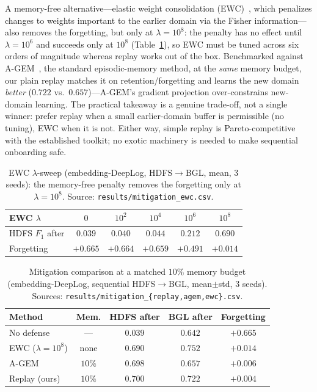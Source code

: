 \documentclass[conference]{IEEEtran}
\begin{document}
A memory-free alternative---elastic weight consolidation (EWC)~\cite{kirkpatrick2017overcoming}, which
penalizes changes to weights important to the earlier domain via the Fisher information---also removes
the forgetting, but only at $\lambda{=}10^{8}$: the penalty has no effect until $\lambda{=}10^{6}$ and
succeeds only at $10^{8}$ (Table~\ref{tab:ewc}), so EWC must be tuned across six orders of magnitude
whereas replay works out of the box. Benchmarked against A-GEM~\cite{agem2019}, the standard
episodic-memory method, at the \emph{same} memory budget, our plain replay matches it on
retention/forgetting and learns the new domain \emph{better} ($0.722$ vs.\ $0.657$)---A-GEM's gradient
projection over-constrains new-domain learning. The practical takeaway is a genuine trade-off, not a
single winner: prefer replay when a small earlier-domain buffer is permissible (no tuning), EWC when it
is not. Either way, simple replay is Pareto-competitive with the established toolkit; no exotic
machinery is needed to make sequential onboarding safe.

\begin{table}[t]
\caption{EWC $\lambda$-sweep (embedding-DeepLog, HDFS$\rightarrow$BGL, mean, $3$ seeds): the memory-free
penalty removes the forgetting only at $\lambda{=}10^{8}$. Source: \texttt{results/mitigation\_ewc.csv}.}
\label{tab:ewc}
\centering\small
\begin{tabular}{@{}lccccc@{}}
\toprule
EWC $\lambda$ & $0$ & $10^{2}$ & $10^{4}$ & $10^{6}$ & $10^{8}$ \\
\midrule
HDFS $F_1$ after & $0.039$ & $0.040$ & $0.044$ & $0.212$ & $\mathbf{0.690}$ \\
Forgetting & $+0.665$ & $+0.664$ & $+0.659$ & $+0.491$ & $\mathbf{+0.014}$ \\
\bottomrule
\end{tabular}
\end{table}

\begin{table}[t]
\caption{Mitigation comparison at a matched $10\%$ memory budget (embedding-DeepLog, sequential
HDFS$\rightarrow$BGL, mean$\pm$std, $3$ seeds). Sources:
\texttt{results/mitigation\_\{replay,agem,ewc\}.csv}.}
\label{tab:fix}
\centering\small
\begin{tabular}{@{}lcccc@{}}
\toprule
Method & Mem. & HDFS after & BGL after & Forgetting \\
\midrule
No defense              & ---   & $0.039$ & $0.642$ & $+0.665$ \\
EWC ($\lambda{=}10^{8}$) & none & $0.690$ & $\mathbf{0.752}$ & $+0.014$ \\
A-GEM~\cite{agem2019}   & $10\%$ & $0.698$ & $0.657$ & $+0.006$ \\
Replay (ours)           & $10\%$ & $\mathbf{0.700}$ & $0.722$ & $\mathbf{+0.004}$ \\
\bottomrule
\end{tabular}
\end{table}
\end{document}
